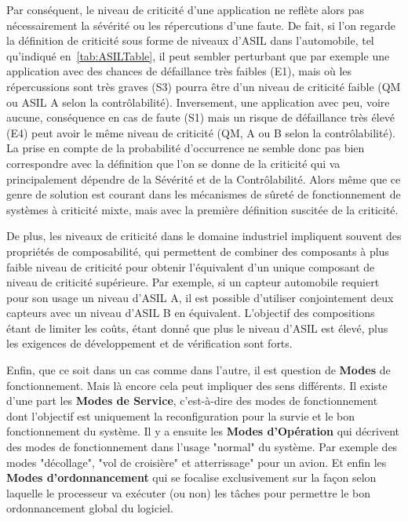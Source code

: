 \documentclass[french, a4paper, 11pt, twoside, pdftex]{StyleThese}
\begin{document}
    Par conséquent, le niveau de criticité d'une application ne reflète alors pas nécessairement la sévérité ou les répercutions d'une faute. De fait, si l'on regarde la définition de criticité sous forme de niveaux d'ASIL dans l'automobile, tel qu'indiqué en~\autoref{tab:ASILTable}, il peut sembler perturbant que par exemple une application avec des chances de défaillance très faibles (E1), mais où les répercussions sont très graves (S3) pourra être d'un niveau de criticité faible (QM ou ASIL A selon la contrôlabilité). Inversement, une application avec peu, voire aucune, conséquence en cas de faute (S1) mais un risque de défaillance très élevé (E4) peut avoir le même niveau de criticité (QM, A ou B selon la contrôlabilité). La prise en compte de la probabilité d'occurrence ne semble donc pas bien correspondre avec la définition que l'on se donne de la criticité qui va principalement dépendre de la Sévérité et de la Contrôlabilité. %
    Alors même que ce genre de solution est courant dans les mécanismes de sûreté de fonctionnement de systèmes à criticité mixte, mais avec la première définition suscitée de la criticité. 
    
    De plus, les niveaux de criticité dans le domaine industriel impliquent souvent des propriétés de composabilité, qui permettent de combiner des composants à plus faible niveau de criticité pour obtenir l'équivalent d'un unique composant de niveau de criticité supérieure. Par exemple, si un capteur automobile requiert pour son usage un niveau d'ASIL A, il est possible d'utiliser conjointement deux capteurs avec un niveau d'ASIL B en équivalent. L'objectif des compositions étant de limiter les coûts, étant donné que plus le niveau d'ASIL est élevé, plus les exigences de développement et de vérification sont forts.
    
    Enfin, que ce soit dans un cas comme dans l'autre, il est question de \textbf{Modes} de fonctionnement. Mais là encore cela peut impliquer des sens différents. Il existe d'une part les \textbf{Modes de Service}, c'est-à-dire des modes de fonctionnement dont l'objectif est uniquement la reconfiguration pour la survie et le bon fonctionnement du système. Il y a ensuite les \textbf{Modes d'Opération} qui décrivent des modes de fonctionnement dans l'usage "normal" du système. Par exemple des modes "décollage", "vol de croisière" et atterrissage" pour un avion. Et enfin les \textbf{Modes d'ordonnancement} qui se focalise exclusivement sur la façon selon laquelle le processeur va exécuter (ou non) les tâches pour permettre le bon ordonnancement global du logiciel.
    
\end{document}
